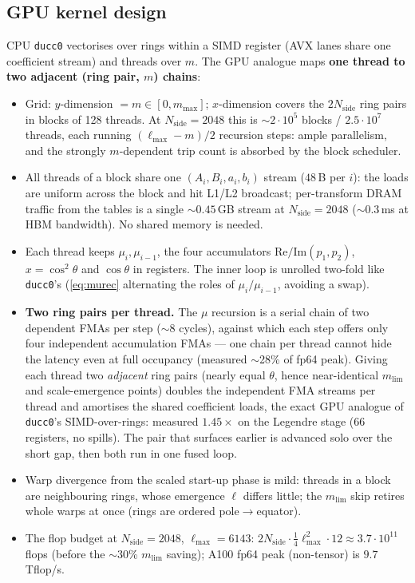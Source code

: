 \documentclass[11pt]{article}
\newcommand{\cth}{\cos\theta}
\begin{document}
\subsection{GPU kernel design}
\label{sec:kernel}

CPU \texttt{ducc0} vectorises over rings within a SIMD register (AVX
lanes share one coefficient stream) and threads over $m$.  The GPU analogue
maps \textbf{one thread to two adjacent (ring pair, $m$) chains}:

\begin{itemize}
\item Grid: $y$-dimension $= m \in [0, m_{\max}]$; $x$-dimension covers
  the $2N_\mathrm{side}$ ring pairs in blocks of 128 threads.  At
  $N_\mathrm{side}=2048$ this is $\sim\!2\cdot10^5$ blocks / $2.5\cdot10^7$
  threads, each running $(\ell_{\max}-m)/2$ recursion steps: ample
  parallelism, and the strongly $m$-dependent trip count is absorbed by the
  block scheduler.
\item All threads of a block share one $(A_i, B_i, a_i, b_i)$ stream
  ($48$\,B per $i$): the loads are uniform across the block and hit L1/L2
  broadcast; per-transform DRAM traffic from the tables is a single
  $\sim\!0.45$\,GB stream at $N_\mathrm{side}=2048$ ($\sim$0.3\,ms at HBM
  bandwidth).  No shared memory is needed.
\item Each thread keeps $\mu_i,\mu_{i-1}$, the four accumulators
  $\mathrm{Re}/\mathrm{Im}(p_1,p_2)$, $x=\cos^2\theta$ and $\cth$ in
  registers.  The inner loop is unrolled two-fold like \texttt{ducc0}'s
  (\eqref{eq:murec} alternating the roles of $\mu_i/\mu_{i-1}$, avoiding a
  swap).
\item \textbf{Two ring pairs per thread.}  The $\mu$ recursion is a serial
  chain of two dependent FMAs per step ($\sim$8 cycles), against which each
  step offers only four independent accumulation FMAs --- one chain per
  thread cannot hide the latency even at full occupancy (measured
  $\sim$28\% of fp64 peak).  Giving each thread two \emph{adjacent} ring
  pairs (nearly equal $\theta$, hence near-identical $m_\mathrm{lim}$ and
  scale-emergence points) doubles the independent FMA streams per thread
  and amortises the shared coefficient loads, the exact GPU analogue of
  \texttt{ducc0}'s SIMD-over-rings: measured $1.45\times$ on the Legendre
  stage (66 registers, no spills).  The pair that surfaces earlier is
  advanced solo over the short gap, then both run in one fused loop.
\item Warp divergence from the scaled start-up phase is mild: threads in a
  block are neighbouring rings, whose emergence $\ell$ differs little; the
  $m_\mathrm{lim}$ skip retires whole warps at once (rings are ordered
  pole$\to$equator).
\item The flop budget at $N_\mathrm{side}=2048$, $\ell_{\max}=6143$:
  $2N_\mathrm{side}\cdot\frac14\ell_{\max}^2 \cdot 12 \approx 3.7\cdot10^{11}$
  flops (before the $\sim$30\% $m_\mathrm{lim}$ saving); A100 fp64 peak
  (non-tensor) is $9.7$\,Tflop/s.
\end{itemize}
\end{document}
